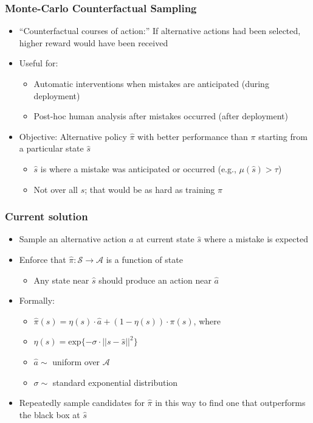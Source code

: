 \documentclass[handout]{beamer}
\begin{document}
\begin{frame}
    \frametitle{Monte-Carlo Counterfactual Sampling}
    \begin{itemize}
    \item ``Counterfactual courses of action:'' If alternative actions had been selected, higher reward would have been received
    \item Useful for:
        \begin{itemize}
        \item Automatic interventions when mistakes are anticipated (during deployment)
        \item Post-hoc human analysis after mistakes occurred (after deployment)
        \end{itemize}
    \item Objective: Alternative policy $\hat{\pi}$ with better performance than $\pi$ starting from a particular state $\hat{s}$
        \begin{itemize}
        \item $\hat{s}$ is where a mistake was anticipated or occurred (e.g., $\mu(\hat{s}) > \tau$)
        \item Not over all $s$; that would be as hard as training $\pi$
        \end{itemize}
    
    \end{itemize}

\end{frame}

\begin{frame}
    \frametitle{Current solution}
    \begin{itemize}
    \item Sample an alternative action $\hat{a}$ at current state $\hat{s}$ where a mistake is expected
    \item Enforce that $\hat{\pi}:\mathcal{S}\rightarrow\mathcal{A}$ is a function of state
        \begin{itemize}
        \item Any state near $\hat{s}$ should produce an action near $\hat{a}$
        \end{itemize}
    \item Formally:
        \begin{itemize}
        \item $\hat{\pi}(s) = \eta(s)\cdot\hat{a} + (1 - \eta(s))\cdot\pi(s)$, where
        \item $\eta(s) = \text{exp}\{-\sigma\cdot||s - \hat{s}||^2\}$
        \item $\hat{a} \sim$ uniform over $\mathcal{A}$
        \item $\sigma\sim$ standard exponential distribution
        \end{itemize}
    \item Repeatedly sample candidates for $\hat{\pi}$ in this way to find one that outperforms the black box at $\hat{s}$
    
    \end{itemize}

\end{frame}
\end{document}
